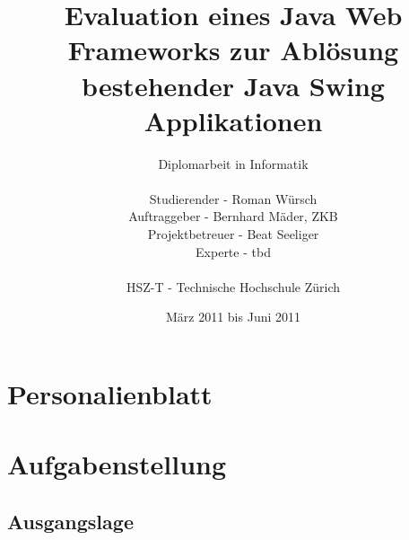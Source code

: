 \documentclass[abstracton, listof=totocnumbered,
bibliography=totocnumbered]{scrreprt}
\title{Evaluation eines Java Web Frameworks zur Ablösung bestehender Java Swing
Applikationen}
\author{Diplomarbeit in Informatik\\
    \\
    Studierender - Roman Würsch\\
	Auftraggeber - Bernhard Mäder, ZKB\\
    Projektbetreuer - Beat Seeliger\\
    Experte - tbd\\
	\\
	HSZ-T - Technische Hochschule Zürich}
\date{März 2011 bis Juni 2011}
\begin{document}
  \ifpdf
  \else
  \fi
  
  
  \maketitle
  
  
  
  
  

  
  \tableofcontents
  
  \clearpage
  
  
  
  \chapter{Personalienblatt}

  
  
  
  
  \chapter{Aufgabenstellung}
  
  \section{Ausgangslage}
  
\end{document}
